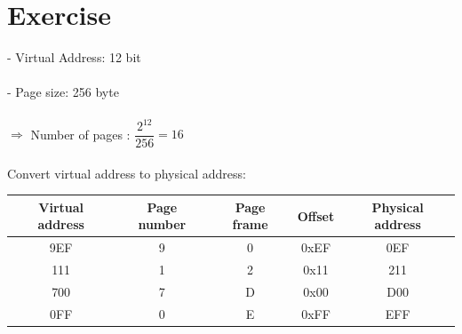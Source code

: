 \documentclass[a4paper]{article}
\begin{document}

\section*{Exercise}
- Virtual Address: 12 bit \\
\\
- Page size: 256 byte \\
\\
$\Rightarrow$ Number of pages : $\dfrac{2^{12}}{256} = 16$ \\
\\
Convert virtual address to physical address:

\begin{center}
\begin{tabular}{|c|c|c|c|c|}
\hline
Virtual address & Page number & Page frame & Offset & Physical address \\
\hline
9EF & 9 & 0 & 0xEF & 0EF \\ 
\hline
111 & 1 & 2 & 0x11 & 211 \\
\hline
700 & 7 & D & 0x00 & D00 \\
\hline
0FF & 0 & E & 0xFF & EFF \\
\hline
\end{tabular}
\end{center}
\end{document}
